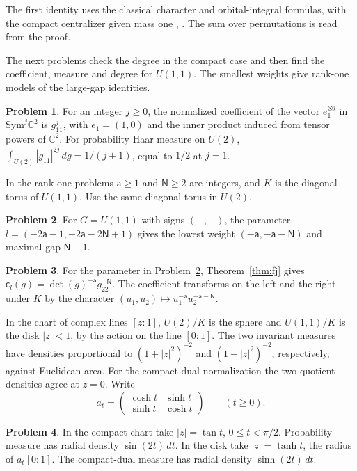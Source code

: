 \documentclass[reqno]{amsart}
\theoremstyle{definition}
\newtheorem{problem}{Problem}[section]
\newcommand{\C}{\mathbb C}
\newcommand{\cc}{\mathsf c}
\newcommand{\ranka}{\mathsf a}
\newcommand{\NN}{\mathsf N}
\begin{document}
\noindent The first identity uses the classical character and orbital-integral formulas, with the compact centralizer given mass one \cite[Theorem~(8.1)]{AS}, \cite[formula~(1)]{Art}. The sum over permutations is read from the proof.

The next problems check the degree in the compact case and then find the coefficient, measure and degree for \(U(1,1)\). The smallest weights give rank-one models of the large-gap identities.

\begin{problem}\label{pr:compact}
For an integer \(j\ge 0\), the normalized coefficient of the vector \(e_1^{\otimes j}\) in \(\mathrm{Sym}^j\C^2\) is \(g_{11}^j\), with \(e_1=(1,0)\) and the inner product induced from tensor powers of \(\C^2\). For probability Haar measure on \(U(2)\), \(\int_{U(2)} |g_{11}|^{2j}\,dg=1/(j+1)\), equal to \(1/2\) at \(j=1\).
\end{problem}

In the rank-one problems \(\ranka\ge1\) and \(\NN\ge2\) are integers, and \(K\) is the diagonal torus of \(U(1,1)\). Use the same diagonal torus in \(U(2)\).

\begin{problem}\label{pr:weight}
For \(G=U(1,1)\) with signs \((+,-)\), the parameter \(l=(-2\ranka-1,-2\ranka-2\NN+1)\) gives the lowest weight \((-\ranka,-\ranka-\NN)\) and maximal gap \(\NN-1\).
\end{problem}

\begin{problem}\label{pr:coefficient}
For the parameter in Problem~\ref{pr:weight}, Theorem~\ref{thm:fj} gives \(\cc_l(g)=\det(g)^{-\ranka}g_{22}^{-\NN}\). The coefficient transforms on the left and the right under \(K\) by the character \( (u_1,u_2)\mapsto u_1^{-\ranka}u_2^{-\ranka-\NN}\).
\end{problem}

In the chart of complex lines \([z:1]\), \(U(2)/K\) is the sphere and \(U(1,1)/K\) is the disk \(|z|<1\), by the action on the line \([0:1]\). The two invariant measures have densities proportional to \((1+|z|^2)^{-2}\) and \((1-|z|^2)^{-2}\), respectively, against Euclidean area. For the compact-dual normalization the two quotient densities agree at \(z=0\). Write
\[
 a_t=\begin{pmatrix}\cosh t&\sinh t\\\sinh t&\cosh t\end{pmatrix}\qquad(t\ge0).
\]

\begin{problem}\label{pr:radial}
In the compact chart take \(|z|=\tan t\), \(0\le t<\pi/2\). Probability measure has radial density \(\sin(2t)\,dt\). In the disk take \(|z|=\tanh t\), the radius of \(a_t[0:1]\). The compact-dual measure has radial density \(\sinh(2t)\,dt\).
\end{problem}
\end{document}
